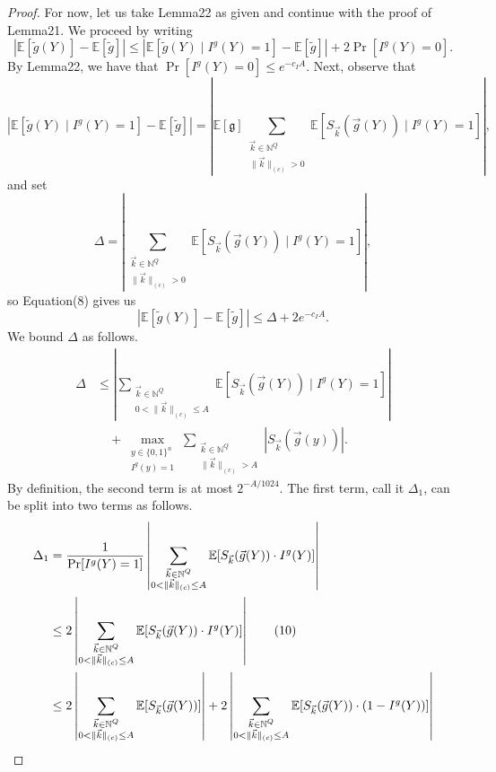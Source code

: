 \documentclass[10pt,a4paper]{article}
\begin{document}
\begin{proof}
For now, let us take Lemma22 as given and continue with the proof of Lemma21. We proceed by writing
\begin{equation}
|\mathbb E[\widetilde g(Y)]-\mathbb E[\widetilde g]|
\le|\mathbb E[\widetilde g(Y)\mid I^g(Y)=1]-\mathbb E[\widetilde g]|
+2\Pr[I^g(Y)=0].\tag{8}
\end{equation}
By Lemma22, we have that $\Pr[I^g(Y)=0]\le e^{-c_IA}$. Next, observe that
\[
|\mathbb E[\widetilde g(Y)\mid I^g(Y)=1]-\mathbb E[\widetilde g]|
=\left|\mathbb E[\mathfrak g]\sum_{\substack{\vec k\in\mathbb N^Q\\\|\vec k\|_{(c)}>0}}
\mathbb E[S_{\vec k}(\vec g(Y))\mid I^g(Y)=1]\right|,
\]
and set
\[
\Delta=\left|\sum_{\substack{\vec k\in\mathbb N^Q\\\|\vec k\|_{(c)}>0}}
\mathbb E[S_{\vec k}(\vec g(Y))\mid I^g(Y)=1]\right|,
\]
so Equation(8) gives us
\begin{equation}
|\mathbb E[\widetilde g(Y)]-\mathbb E[\widetilde g]|\le\Delta+2e^{-c_IA}.\tag{9}
\end{equation}
We bound $\Delta$ as follows.
\begin{align*}
\Delta&\le\left|\sum_{\substack{\vec k\in\mathbb N^Q\\0<\|\vec k\|_{(c)}\le A}}
\mathbb E[S_{\vec k}(\vec g(Y))\mid I^g(Y)=1]\right|\\
&\quad+\max_{\substack{y\in\{0,1\}^n\\I^g(y)=1}}
\sum_{\substack{\vec k\in\mathbb N^Q\\\|\vec k\|_{(c)}>A}}|S_{\vec k}(\vec g(y))|.
\end{align*}
By definition, the second term is at most $2^{-A/1024}$. The first term, call it $\Delta_1$, can be split into two terms as follows.
\begin{align}
\Delta_1
&=\frac1{\Pr[I^g(Y)=1]}\left|\sum_{\substack{\vec k\in\mathbb N^Q\\0<\|\vec k\|_{(c)}\le A}}\mathbb E[S_{\vec k}(\vec g(Y))\cdot I^g(Y)]\right|\notag\\
&\le2\left|\sum_{\substack{\vec k\in\mathbb N^Q\\0<\|\vec k\|_{(c)}\le A}}\mathbb E[S_{\vec k}(\vec g(Y))\cdot I^g(Y)]\right|\tag{10}\\
&\le2\left|\sum_{\substack{\vec k\in\mathbb N^Q\\0<\|\vec k\|_{(c)}\le A}}\mathbb E[S_{\vec k}(\vec g(Y))]\right|
+2\left|\sum_{\substack{\vec k\in\mathbb N^Q\\0<\|\vec k\|_{(c)}\le A}}\mathbb E[S_{\vec k}(\vec g(Y))\cdot(1-I^g(Y))]\right|\notag\\

\end{align}
\end{proof}
\end{document}
